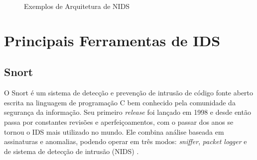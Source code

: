 \documentclass[
	12pt,				
	openright,		
	twoside,	
	a4paper,
	english,	
	brazil	
	]{abntex2}
\begin{document}
 \begin{figure}[!htb]
  \centering
   \quad
   \caption{Exemplos de Arquitetura de NIDS}
   \label{nids}
  \end{figure}

 \section{Principais Ferramentas de IDS}
 \subsection{Snort}

 O Snort é um sistema de detecção e prevenção de intrusão de código fonte aberto escrita na linguagem de programação C bem conhecido pela comunidade da segurança da informação. Seu primeiro \textit{release} foi lançado em 1998 e desde então passa por constantes revisões e aperfeiçoamentos, com o passar dos anos se tornou o IDS mais utilizado no mundo. Ele combina análise baseada em assinaturas e anomalias, podendo operar em três modos: \textit{sniffer}, \textit{packet logger} e de sistema de detecção de intrusão (NIDS) \cite{snortorgbr}.
\end{document}
